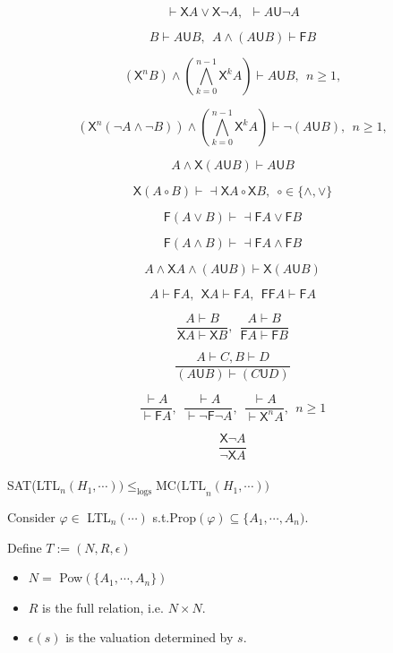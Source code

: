 \documentclass[12pt]{article}
\begin{document}
\begin{CJK*}{GBK}{song}
$$\vdash\textsf{X}A\vee \textsf{X}\neg A,\ \ \vdash A\textsf{U}\neg A$$

$${B}\vdash {A\textsf{U} B}, \ \ A\wedge (A\textsf{U}B)\vdash \textsf{F}B$$

$$(\textsf{X}^nB)\wedge \left(\bigwedge^{n-1}_{k=0}\textsf{X}^kA\right)\vdash A\textsf{U}B,\ \ n\geq 1, $$ %

$$(\textsf{X}^n(\neg A\wedge\neg B))\wedge \left(\bigwedge^{n-1}_{k=0}\textsf{X}^kA\right)\vdash \neg (A\textsf{U}B),\ \ n\geq 1, $$ %


$${A\wedge \textsf{X}(A\textsf{U}B)}\vdash {A\textsf{U}B}$$

$$\textsf{X}(A\circ B)\vdash\dashv \textsf{X}A\circ\textsf{X}B,\ \ \circ\in\{\wedge,\vee\}$$

$$\textsf{F}(A\vee B)\vdash \dashv \textsf{F}A\vee\textsf{F}B$$ %

$$\textsf{F}(A\wedge B)\vdash \dashv \textsf{F}A\wedge\textsf{F}B$$ %

$${A\wedge\textsf{X}A\wedge (A\textsf{U}B)}\vdash {\textsf{X}(A\textsf{U}B)}$$

$${A}\vdash {\textsf{F}A},\ \ {\textsf{X}A}\vdash {\textsf{F}A},\ \ {\textsf{FF}A}\vdash {\textsf{F}A}$$

$$\frac{A\vdash B}{\textsf{X}A\vdash \textsf{X}B},\ \ \frac{A\vdash B}{\textsf{F}A\vdash \textsf{F}B}  $$

$$\frac{A\vdash C, B\vdash D}{(A\textsf{U}B)\vdash (C\textsf{U}D)}$$

$$\frac{\vdash A}{\vdash \textsf{F}A}, \ \ \frac{\vdash A}{\vdash \neg \textsf{F}\neg A},\ \ \frac{\vdash A}{\vdash \textsf{X}^nA},\ \ n\geq 1$$


$$\frac{\textsf{X}\neg A}{\neg \textsf{X}A}$$
\ \\

SAT(LTL$_n(H_1,\cdots))\leq_{\text{logs}}\mbox{MC(LTL}_n(H_1,\cdots))$

Consider $\varphi\in$ LTL$_n(\cdots)$ s.t.Prop$(\varphi)\subseteq\{A_1,\cdots, A_n)$.

Define $T:=(N, R, \epsilon)$

\begin{itemize}
\item $N=$ Pow$(\{A_1,\cdots, A_n\})$

\item $R$ is the full relation, i.e. $N\times N$.

\item $\epsilon(s)$ is the valuation determined by $s$.
\end{itemize}


\end{CJK*}
\end{document}

